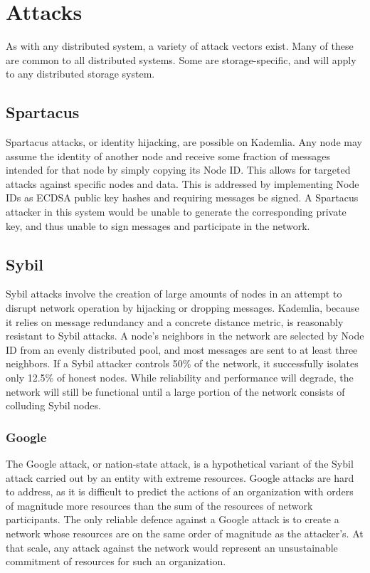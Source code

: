 \documentclass[a4paper,10pt]{article}
\begin{document}
\section{Attacks}
As with any distributed system, a variety of attack vectors exist. Many of these
are common to all distributed systems. Some are storage-specific, and will apply
to any distributed storage system.

\subsection{Spartacus}
Spartacus attacks, or identity hijacking, are possible on Kademlia. Any node may
assume the identity of another node and receive some fraction of messages
intended for that node by simply copying its Node ID. This allows for targeted
attacks against specific nodes and data. This is addressed by implementing Node
IDs as ECDSA public key hashes and requiring messages be signed. A Spartacus
attacker in this system would be unable to generate the corresponding private
key, and thus unable to sign messages and participate in the network.

\subsection{Sybil}

Sybil attacks involve the creation of large amounts of nodes in an attempt to
disrupt network operation by hijacking or dropping messages. Kademlia, because
it relies on message redundancy and a concrete distance metric, is reasonably
resistant to Sybil attacks. A node’s neighbors in the network are selected by
Node ID from an evenly distributed pool, and most messages are sent to at least
three neighbors. If a Sybil attacker controls 50\% of the network, it
successfully isolates only 12.5\% of honest nodes. While reliability and
performance will degrade, the network will still be functional until a large
portion of the network consists of colluding Sybil nodes.

\subsubsection{Google}
The Google attack, or nation-state attack, is a hypothetical variant of the
Sybil attack carried out by an entity with extreme resources. Google attacks are
hard to address, as it is difficult to predict the actions of an organization
with orders of magnitude more resources than the sum of the resources of network
participants. The only reliable defence against a Google attack is to create a
network whose resources are on the same order of magnitude as the attacker’s. At
that scale, any attack against the network would represent an unsustainable
commitment of resources for such an organization.
\end{document}
